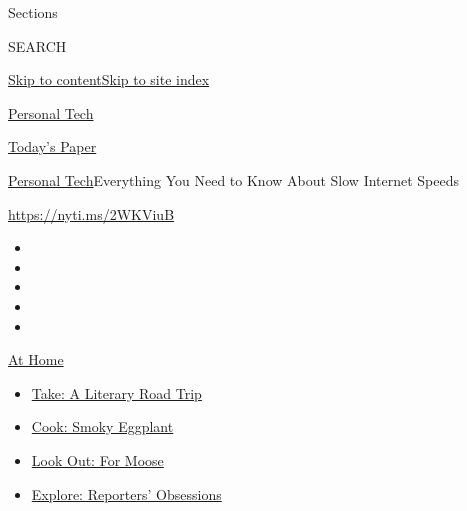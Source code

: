 Sections

SEARCH

\protect\hyperlink{site-content}{Skip to
content}\protect\hyperlink{site-index}{Skip to site index}

\href{https://www.nytimes3xbfgragh.onion/section/technology/personaltech}{Personal
Tech}

\href{https://myaccount.nytimes3xbfgragh.onion/auth/login?response_type=cookie\&client_id=vi}{}

\href{https://www.nytimes3xbfgragh.onion/section/todayspaper}{Today's
Paper}

\href{/section/technology/personaltech}{Personal
Tech}\textbar{}Everything You Need to Know About Slow Internet Speeds

\href{https://nyti.ms/2WKViuB}{https://nyti.ms/2WKViuB}

\begin{itemize}
\item
\item
\item
\item
\item
\end{itemize}

\href{https://www.nytimes3xbfgragh.onion/spotlight/at-home?action=click\&pgtype=Article\&state=default\&region=TOP_BANNER\&context=at_home_menu}{At
Home}

\begin{itemize}
\tightlist
\item
  \href{https://www.nytimes3xbfgragh.onion/2020/07/28/books/time-for-a-literary-road-trip.html?action=click\&pgtype=Article\&state=default\&region=TOP_BANNER\&context=at_home_menu}{Take:
  A Literary Road Trip}
\item
  \href{https://www.nytimes3xbfgragh.onion/2020/07/29/magazine/bored-with-your-home-cooking-some-smoky-eggplant-will-fix-that.html?action=click\&pgtype=Article\&state=default\&region=TOP_BANNER\&context=at_home_menu}{Cook:
  Smoky Eggplant}
\item
  \href{https://www.nytimes3xbfgragh.onion/2020/07/27/travel/moose-michigan-isle-royale.html?action=click\&pgtype=Article\&state=default\&region=TOP_BANNER\&context=at_home_menu}{Look
  Out: For Moose}
\item
  \href{https://www.nytimes3xbfgragh.onion/interactive/2020/at-home/even-more-reporters-editors-diaries-lists-recommendations.html?action=click\&pgtype=Article\&state=default\&region=TOP_BANNER\&context=at_home_menu}{Explore:
  Reporters' Obsessions}
\end{itemize}

